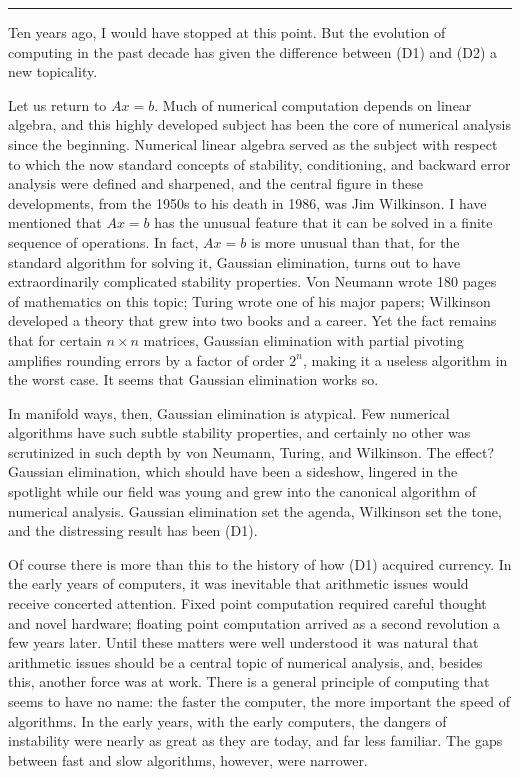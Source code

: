 \vspace{1em}
\hrule 
\vspace{1em}

Ten years ago, I would have stopped at this point. But the evolution of computing in the past decade has given the difference between (D1) and (D2) a new topicality.

Let us return to $A x=b$. Much of numerical computation depends on linear algebra, and this highly developed subject has been the core of numerical analysis since the beginning. Numerical linear algebra served as the subject with respect to which the now standard concepts of stability, conditioning, and backward error analysis were defined and sharpened, and the central figure in these developments, from the 1950s to his death in 1986, was Jim Wilkinson.
I have mentioned that $A x=b$ has the unusual feature that it can be solved in a finite sequence of operations. In fact, $A x=b$ is more unusual than that, for the standard algorithm for solving it, Gaussian elimination, turns out to have extraordinarily complicated stability properties. Von Neumann wrote 180 pages of mathematics on this topic; Turing wrote one of his major papers; Wilkinson developed a theory that grew into two books and a career. Yet the fact remains that for certain $n \times n$ matrices, Gaussian elimination with partial pivoting amplifies rounding errors by a factor of order $2^n$, making it a useless algorithm in the worst case. It seems that Gaussian elimination works so. 

In manifold ways, then, Gaussian elimination is atypical. Few numerical algorithms have such subtle stability properties, and certainly no other was scrutinized in such depth by von Neumann, Turing, and Wilkinson. The effect? Gaussian elimination, which should have been a sideshow, lingered in the spotlight while our field was young and grew into the canonical algorithm of numerical analysis. Gaussian elimination set the agenda, Wilkinson set the tone, and the distressing result has been (D1).

Of course there is more than this to the history of how (D1) acquired currency. In the early years of computers, it was inevitable that arithmetic issues would receive concerted attention. Fixed point computation required careful thought and novel hardware; floating point computation arrived as a second revolution a few years later. Until these matters were well understood it was natural that arithmetic issues should be a central topic of numerical analysis, and, besides this, another force was at work. There is a general principle of computing that seems to have no name: the faster the computer, the more important the speed of algorithms. In the early years, with the early computers, the dangers of instability were nearly as great as they are today, and far less familiar. The gaps between fast and slow algorithms, however, were narrower.

